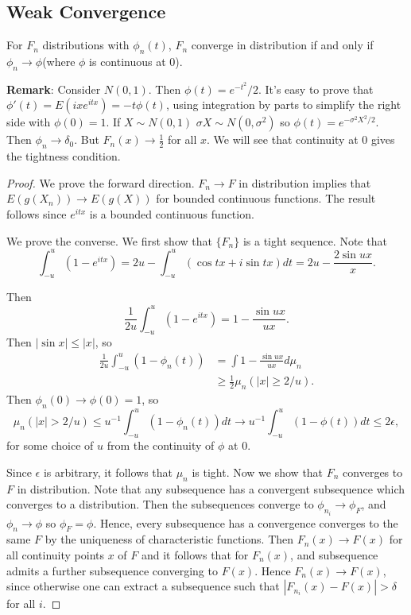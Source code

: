 \documentclass[11pt]{scrartcl}
\begin{document}
\subsection{Weak Convergence}
\begin{thm} For $F_n$ distributions with $\phi_n(t)$, $F_n$ converge in distribution if and only if $\phi_n \rightarrow \phi$(where $\phi$ is continuous at $0$).
\end{thm}
\textbf{Remark}:  Consider $N(0, 1)$.  Then $\phi(t) = e^{-t^2}/2$.  It's easy to prove that $\phi'(t) = E(ixe^{itx}) = -t\phi(t)$, using integration by parts to simplify the right side with $\phi(0) = 1$.  If $X \sim N(0, 1)$ $\sigma X \sim N(0, \sigma^2)$ so $\phi(t) = e^{-\sigma^2X^2/2}.$  Then $\phi_n \rightarrow \delta_0$.  But $F_n(x) \rightarrow \frac{1}{2}$ for all $x$.  We will see that continuity at $0$ gives the tightness condition.
\begin{proof}
We prove the forward direction.  $F_n \rightarrow F$ in distribution implies that $E(g(X_n)) \to E(g(X))$ for bounded continuous functions.  The result follows since $e^{itx}$ is a bounded continuous function.

We prove the converse.  We first show that $\{F_n\}$ is a tight sequence.
Note that 
$$\int_{-u}^u (1-e^{itx}) = 2u - \int_{-u}^u (\cos{tx} + i\sin{tx})dt = 2u - \frac{2\sin{ux}}{x}.$$

Then
$$\frac{1}{2u} \int_{-u}^u (1-e^{itx})= 1 - \frac{\sin{ux}}{ux}.$$
Then $|\sin{x}| \le |x|$, so 
\begin{align*}
\frac{1}{2u} \int_{-u}^u (1 - \phi_n(t)) &= \int 1 - \frac{\sin{ux}}{ux} d\mu_n \\
&\ge \frac{1}{2} \mu_n(|x| \ge 2/u).
\end{align*}
Then $\phi_n(0) \rightarrow \phi(0) = 1$, so
$$\mu_n(|x| > 2/u) \le u^{-1} \int_{-u}^u (1-\phi_n(t))dt \rightarrow u^{-1} \int_{-u}^u (1-\phi(t))dt \le 2\epsilon,$$
for some choice of $u$ from the continuity of $\phi$ at $0$. 

Since $\epsilon$ is arbitrary, it follows that $\mu_n$ is tight.  Now we show that $F_n$ converges to $F$ in distribution.  Note that any subsequence has a convergent subsequence which converges to a distribution.  Then the subsequences converge to $\phi_{n_i} \rightarrow \phi_F$, and $\phi_n \rightarrow \phi$ so $\phi_F = \phi$.  Hence, every subsequence has a convergence converges to the same $F$ by the uniqueness of characteristic functions.  Then $F_n(x) \to F(x)$ for all continuity points $x$ of $F$ and it follows that for $F_n(x)$, and subsequence admits a further subsequence converging to $F(x)$.  Hence $F_n(x) \to F(x)$, since otherwise one can extract a subsequence such that $|F_{{n_i}}(x) - F(x)| > \delta$ for all $i$.
\end{proof}
\end{document}
